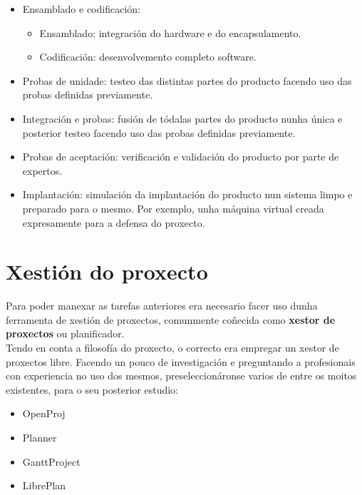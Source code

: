 \begin{enumerate}
\begin{itemize}
\begin{itemize}
\begin{itemize}
                     \end{itemize}
               \item Ensamblado e codificación:
                     \begin{itemize}
                      \item Ensamblado: integración do hardware e do
                            encapsulamento.
                      \item Codificación: desenvolvemento completo software.
                     \end{itemize}
               \item Probas de unidade: testeo das distintas partes do producto
                     facendo uso das probas definidas previamente.
               \item Integración e probas: fusión de tódalas partes do producto
                     nunha única e posterior testeo facendo uso das probas
                     definidas previamente.
               \item Probas de aceptación: verificación e validación do
                     producto por parte de expertos.
               \item Implantación: simulación da implantación do producto nun
                     sistema limpo e preparado para o mesmo. Por exemplo, unha
                     máquina virtual creada expresamente para a defensa do
                     proxecto.
              \end{itemize}
       \end{itemize}
\end{enumerate}

\section{Xestión do proxecto}

Para poder manexar as tarefas anteriores era necesario facer uso dunha
ferramenta de xestión de proxectos, comunmente coñecida como \textbf{xestor de
proxectos} ou planificador. \\

Tendo en conta a filosofía do proxecto, o correcto era empregar un xestor de
proxectos libre. Facendo un pouco de investigación e preguntando a profesionais
con experiencia no uso dos mesmos, preseleccionáronse varios de entre os moitos
existentes, para o seu posterior estudio:

\begin{itemize}
 \item OpenProj \cite{OpenProj}
 \item Planner \cite{Planner}
 \item GanttProject \cite{GanttProject}
 \item LibrePlan \cite{LibrePlan}
\end{itemize}

